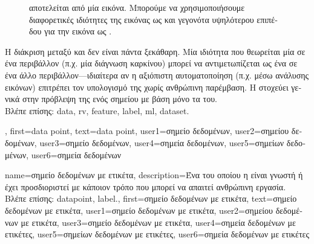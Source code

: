 {{\begin{figure}[H]
{{{			αποτελείται από μία εικόνα. Μπορούμε να χρησιμοποιήσουμε διαφορετικές ιδιότητες της εικόνας ως}  
			\foreignlanguage{greek}{και γεγονότα υψηλότερου επιπέδου για την εικόνα ως} .\label{fig:datapoint_cowherd_dict}} }
		\end{figure}
		\foreignlanguage{greek}{Η διάκριση μεταξύ}  \foreignlanguage{greek}{και}  
		\foreignlanguage{greek}{δεν είναι πάντα ξεκάθαρη. Μία ιδιότητα που θεωρείται μία} 
 		\foreignlanguage{greek}{σε ένα περιβάλλον (π.χ. μία διάγνωση καρκίνου) μπορεί να αντιμετωπίζεται ως ένα} 
 		 \foreignlanguage{greek}{σε ένα άλλο περιβάλλον—ιδιαίτερα αν η αξιόπιστη αυτοματοποίηση  
 		(π.χ. μέσω ανάλυσης εικόνων) επιτρέπει τον υπολογισμό της χωρίς ανθρώπινη παρέμβαση. Η}  
   		\foreignlanguage{greek}{στοχεύει γενικά στην πρόβλεψη της}  \foreignlanguage{greek}{ενός σημείου} 
		 \foreignlanguage{greek}{με βάση μόνο τα}  \foreignlanguage{greek}{του}. \\
		\foreignlanguage{greek}{Βλέπε επίσης:} \gls{data}, \gls{rv}, \gls{feature}, \gls{label}, \gls{ml}, \gls{dataset}.}, 
	first={data point},
	text={data point},
	user1={\foreignlanguage{greek}{σημείο δεδομένων}}, %
	user2={\foreignlanguage{greek}{σημείου δεδομένων}}, %
	user3={\foreignlanguage{greek}{σημείο δεδομένων}}, %
	user4={\foreignlanguage{greek}{σημεία δεδομένων}}, %
	user5={\foreignlanguage{greek}{σημείων δεδομένων}}, %
	user6={\foreignlanguage{greek}{ση\-μεί\-α δεδομένων}} %
}

{name={\foreignlanguage{greek}{σημείο δεδομένων με ετικέτα}},
 	description={\foreignlanguage{greek}{Ένα}  
		\foreignlanguage{greek}{του οποίου η}  \foreignlanguage{greek}{είναι γνωστή ή έχει προσδιοριστεί με κάποιον 
		τρόπο που μπορεί να απαιτεί ανθρώπινη εργασία.} \\
		\foreignlanguage{greek}{Βλέπε επίσης:} \gls{datapoint}, \gls{label}.},
 	first={\foreignlanguage{greek}{σημείο δεδομένων με ετικέτα}},
 	text={\foreignlanguage{greek}{σημείο δεδομένων με ετικέτα}},
 	user1={\foreignlanguage{greek}{σημείο δεδομένων με ετικέτα}}, %
 	user2={\foreignlanguage{greek}{σημείου δεδομένων με ετικέτα}}, %
 	user3={\foreignlanguage{greek}{σημείο δεδομένων με ετικέτα}}, %
 	user4={\foreignlanguage{greek}{σημεία δεδομένων με ετικέτες}}, %
 	user5={\foreignlanguage{greek}{σημείων δεδομένων με ετικέτες}}, %
 	user6={\foreignlanguage{greek}{σημεία δεδομένων με ετικέτες}} %
}

